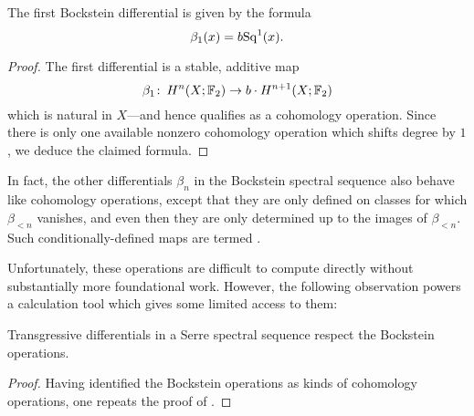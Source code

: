 \begin{lemma}
The first Bockstein differential is given by the formula \[\beta_1(x) = b \mathrm{Sq}^1(x).\]
\end{lemma}
\begin{proof}
The first differential is a stable, additive map \[\beta_1\colon\thinspace H^n(X; \mathbb F_2) \to b \cdot H^{n+1}(X; \mathbb F_2)\] which is natural in $X$---and hence qualifies as a cohomology operation.
Since there is only one available nonzero cohomology operation which shifts degree by $1$, we deduce the claimed formula.
\end{proof}

\begin{definition}
In fact, the other differentials $\beta_n$ in the Bockstein spectral sequence also behave like cohomology operations, except that they are only defined on classes for which $\beta_{<n}$ vanishes, and even then they are only determined up to the images of $\beta_{<n}$.
Such conditionally-defined maps are termed .
\end{definition}

Unfortunately, these operations are difficult to compute directly without substantially more foundational work.
However, the following observation powers a calculation tool which gives some limited access to them:

\begin{corollary}
Transgressive differentials in a Serre spectral sequence respect the Bockstein operations.
\end{corollary}
\begin{proof}
Having identified the Bockstein operations as kinds of cohomology operations, one repeats the proof of .
\end{proof}

